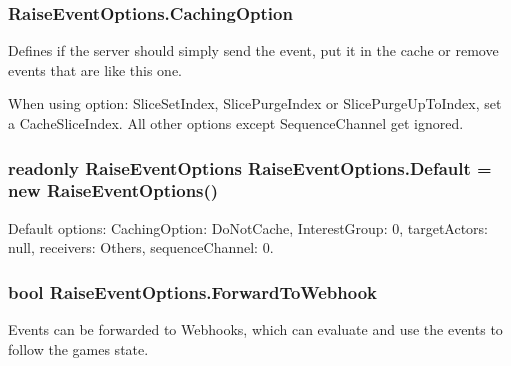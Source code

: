 \subsubsection[{\texorpdfstring{Caching\+Option}{CachingOption}}]{ Raise\+Event\+Options.\+Caching\+Option}\hypertarget{class_raise_event_options_a4f5d60401abe2561ab71c9ff9290c06b}{}\label{class_raise_event_options_a4f5d60401abe2561ab71c9ff9290c06b}


Defines if the server should simply send the event, put it in the cache or remove events that are like this one. 

When using option\+: Slice\+Set\+Index, Slice\+Purge\+Index or Slice\+Purge\+Up\+To\+Index, set a Cache\+Slice\+Index. All other options except Sequence\+Channel get ignored. 
\subsubsection[{\texorpdfstring{Default}{Default}}]{\setlength{\rightskip}{0pt plus 5cm}readonly {\bf Raise\+Event\+Options} Raise\+Event\+Options.\+Default = new {\bf Raise\+Event\+Options}()\hspace{0.3cm}{\ttfamily [static]}}\hypertarget{class_raise_event_options_af1fcb68ddd5f76876c8448de8b5ecb4d}{}\label{class_raise_event_options_af1fcb68ddd5f76876c8448de8b5ecb4d}


Default options\+: Caching\+Option\+: Do\+Not\+Cache, Interest\+Group\+: 0, target\+Actors\+: null, receivers\+: Others, sequence\+Channel\+: 0.

\subsubsection[{\texorpdfstring{Forward\+To\+Webhook}{ForwardToWebhook}}]{\setlength{\rightskip}{0pt plus 5cm}bool Raise\+Event\+Options.\+Forward\+To\+Webhook}\hypertarget{class_raise_event_options_a389e7e5b0df4ce93ba2731a51abc560b}{}\label{class_raise_event_options_a389e7e5b0df4ce93ba2731a51abc560b}


Events can be forwarded to Webhooks, which can evaluate and use the events to follow the game\textquotesingle{}s state.

